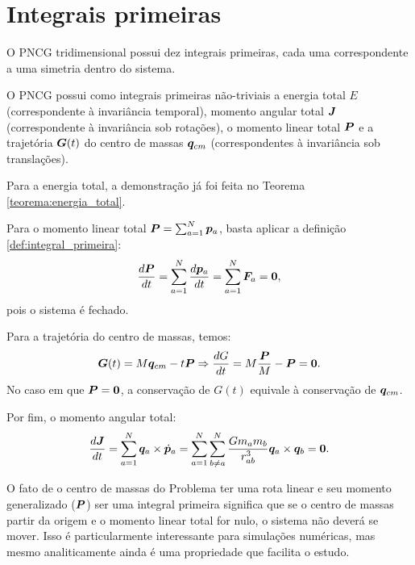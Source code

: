 \section{Integrais primeiras}
O PNCG tridimensional possui dez integrais primeiras, cada uma correspondente a uma simetria dentro do sistema.

\begin{theorem}
    O PNCG possui como integrais primeiras não-triviais a energia total $E$ (correspondente à invariância temporal), momento angular total $\bm J$ (correspondente à invariância sob rotações), o momento linear total $\bm P$ e a trajetória $\bm G(t)$ do centro de massas $\bm q_{cm}$ (correspondentes à invariância sob translações).
\end{theorem}
\begin{Proof}
    Para a energia total, a demonstração já foi feita no Teorema \ref{teorema:energia_total}.

    Para o momento linear total $\bm P = \sum_{a=1}^N \bm p_a$, basta aplicar a definição \ref{def:integral_primeira}:
    \begin{equation*}
        \dfrac{d \bm P}{d t} = \sum_{a=1}^{N} \dfrac{d \bm p_a}{d t} = \sum_{a=1}^N \bm F_a = \bm 0,
    \end{equation*}
    pois o sistema é fechado.

    Para a trajetória do centro de massas, temos:
    \begin{equation}
        \bm G(t) = M \bm q_{cm} - t \bm P
        \Rightarrow
        \dfrac{d G}{d t} = M \dfrac{\bm P}{M} - \bm P = \bm 0.
    \end{equation}
    No caso em que $\bm P = \bm 0$, a conservação de $G(t)$ equivale à conservação de $\bm q_{cm}$.

    Por fim, o momento angular total:
    \begin{equation}
        \dfrac{d \bm J}{d t} 
        = \sum_{a=1}^N \bm q_a \times \dot {\bm p}_a
        = \sum_{a=1}^N \sum_{b\neq a}^{N} \dfrac{G m_a m_b}{r_{ab}^3} \bm q_a \times \bm q_b = \bm 0.
    \end{equation}
\end{Proof}

O fato de o centro de massas do Problema ter uma rota linear e seu momento generalizado ($\bm P$) ser uma integral primeira significa que se o centro de massas partir da origem e o momento linear total for nulo, o sistema não deverá se mover. Isso é particularmente interessante para simulações numéricas, mas mesmo analiticamente ainda é uma propriedade que facilita o estudo.